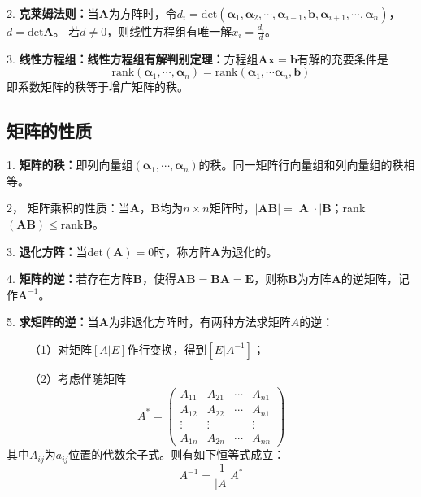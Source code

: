 2. \textbf{克莱姆法则：}当$\boldsymbol{A}$为方阵时，令$d_i=\text{det}(\boldsymbol{\alpha}_1,\boldsymbol{\alpha}_2,\cdots,\boldsymbol{\alpha}_{i-1},\boldsymbol{b},\boldsymbol{\alpha}_{i+1},\cdots,\boldsymbol{\alpha}_n)$，$d=\text{det}\boldsymbol{A}$。
若$d\neq 0$，则线性方程组有唯一解$x_i=\frac{d_i}{d}$。

3. \textbf{线性方程组：线性方程组有解判别定理：}方程组$\boldsymbol{A}\boldsymbol{x}=\boldsymbol{b}$有解的充要条件是
\begin{equation*}
    \text{rank}(\boldsymbol{\alpha}_1,\cdots,\boldsymbol{\alpha}_n)=\text{rank}(\boldsymbol{\alpha}_1,\cdots\boldsymbol{\alpha}_n,\boldsymbol{b})
\end{equation*}
即系数矩阵的秩等于增广矩阵的秩。

\subsection{矩阵的性质}

1. \textbf{矩阵的秩：}即列向量组$(\boldsymbol{\alpha}_1,\cdots,\boldsymbol{\alpha}_n)$的秩。同一矩阵行向量组和列向量组的秩相等。

2， 矩阵乘积的性质：当$\boldsymbol{A}$，$\boldsymbol{B}$均为$n\times n$矩阵时，$|\boldsymbol{A}\boldsymbol{B}|=|\boldsymbol{A}|\cdot|\boldsymbol{B}$；rank$(\boldsymbol{A}\boldsymbol{B})\leqslant\text{rank}\boldsymbol{B}$。 

3. \textbf{退化方阵：}当det$(\boldsymbol{A})=0$时，称方阵$\boldsymbol{A}$为退化的。

4. \textbf{矩阵的逆：}若存在方阵$\boldsymbol{B}$，使得$\boldsymbol{A}\boldsymbol{B}=\boldsymbol{B}\boldsymbol{A}=\boldsymbol{E}$，则称$\boldsymbol{B}$为方阵$\boldsymbol{A}$的逆矩阵，记作$\boldsymbol{A}^{-1}$。

5. \textbf{求矩阵的逆：}当$\boldsymbol{A}$为非退化方阵时，有两种方法求矩阵$A$的逆：

~~~~（1）对矩阵$[A|E]$作行变换，得到$[E|A^{-1}]$；

~~~~（2）考虑伴随矩阵
\begin{equation*}
    A^*=\begin{pmatrix}
        A_{11}&A_{21}&\cdots&A_{n1}\\
        A_{12}&A_{22}&\cdots&A_{n1}\\
        \vdots&\vdots&&\vdots\\
        A_{1n}&A_{2n}&\cdots&A_{nn}
    \end{pmatrix}
\end{equation*}
其中$A_{ij}$为$a_{ij}$位置的代数余子式。则有如下恒等式成立：
\begin{equation*}
    A^{-1}=\frac{1}{|A|}A^*
\end{equation*}

